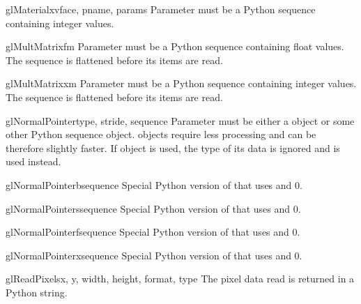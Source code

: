 \begin{funcdesc}{glMaterialxv}{face, pname, params}
Parameter  must be a Python sequence containing integer values.
\end{funcdesc}

\begin{funcdesc}{glMultMatrixf}{m}
Parameter  must be a Python sequence containing float values. The
sequence is flattened before its items are read.
\end{funcdesc}

\begin{funcdesc}{glMultMatrixx}{m}
Parameter  must be a Python sequence containing integer values. The
sequence is flattened before its items are read.
\end{funcdesc}

\begin{funcdesc}{glNormalPointer}{type, stride, sequence}
Parameter  must be either a  object or some other
Python sequence object.  objects require less processing and
can be therefore slightly faster. If  object is used, the type
of its data is ignored and  is used instead.
\end{funcdesc}

\begin{funcdesc}{glNormalPointerb}{sequence}
Special Python version of  that uses 
 and  0.
\end{funcdesc}

\begin{funcdesc}{glNormalPointers}{sequence}
Special Python version of  that uses 
 and  0.
\end{funcdesc}

\begin{funcdesc}{glNormalPointerf}{sequence}
Special Python version of  that uses 
 and  0.
\end{funcdesc}

\begin{funcdesc}{glNormalPointerx}{sequence}
Special Python version of  that uses 
 and  0.
\end{funcdesc}

\begin{funcdesc}{glReadPixels}{x, y, width, height, format, type}
The pixel data read is returned in a Python string.
\end{funcdesc}

